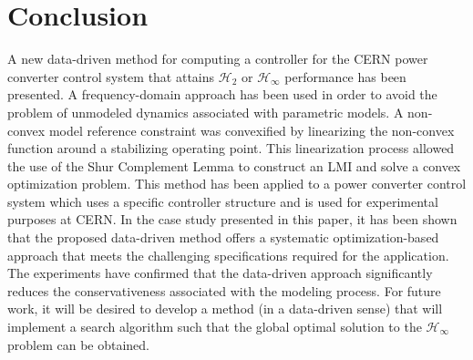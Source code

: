 \documentclass[a4paper, 10pt, conference]{ieeeconf}
\begin{document}
\section{Conclusion}
\label{sec:conclusion}
A new data-driven method for computing a controller for the CERN power converter control system that attains $\mathcal{H}_2$ or $\mathcal{H}_{\infty}$ performance has been presented. A frequency-domain approach has been used in order to avoid the problem of unmodeled dynamics associated with parametric models. A non-convex model reference constraint was convexified by linearizing the non-convex function around a stabilizing operating point. This linearization process allowed the use of the Shur Complement Lemma to construct an LMI and solve a convex optimization problem. This method has been applied to a power converter control system which uses a specific controller structure and is used for experimental purposes at CERN. In the case study presented in this paper, it has been shown that the proposed data-driven method offers a systematic optimization-based approach that meets the challenging specifications required for the application. The experiments have confirmed that the data-driven approach significantly reduces the conservativeness associated with the modeling process. For future work, it will be desired to develop a method (in a data-driven sense) that will implement a search algorithm such that the global optimal solution to the $\mathcal{H}_{\infty}$ problem can be obtained.



\end{document}
